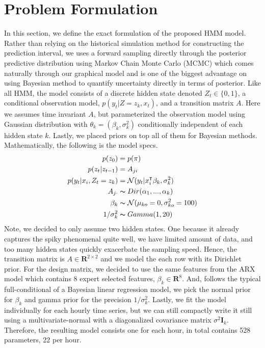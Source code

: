 \documentclass[11pt, letterpaper, journal]{IEEEtran}
\begin{document}
\section{Problem Formulation}
In this section, we define the exact formulation of the proposed HMM model. Rather than relying on the historical simulation method for constructing the prediction interval, we uses a forward sampling directly through the posterior predictive distribution using Markov Chain Monte Carlo (MCMC) which comes naturally through our graphical model and is one of the biggest advantage on using Bayesian method to quantify uncertainty directly in terms of posterior. Like all HMM, the model consists of a discrete hidden state denoted $Z_t \in \{0, 1\}$, a conditional observation model, $p(y_t|Z=z_k, x_t)$, and a transition matrix $A$. Here we assumes time invariant $A$, but parameterized the observation model using Gaussian distribution with $\theta_k=(\beta_k, \sigma_k^2)$ conditionally independent of each hidden state $k$. Lastly, we placed priors on top all of them for Bayesian methods. Mathematically, the following is the model specs.
\begin{align*}
    p(z_0) &= p(\pi) \\
    p(z_t|z_{t-1}) &= A_{ji} \\
    p(y_t|x_i, Z_t=z_k) &= \mathcal{N}(y_t|x_i^{\intercal}\beta_k, \sigma^2_k) \\
    A_{j\cdot} &\thicksim Dir({\alpha_1, ..., \alpha_k}) \\
    \beta_k &\thicksim \mathcal{N}(\mu_{ko}=0, \sigma^2_{ko}=100) \\
    1/\sigma^2_{k} &\thicksim Gamma(1, 20)
\end{align*}
Note, we decided to only assume two hidden states. One because it already captures the spiky phenomenal quite well, we have limited amount of data, and too many hidden states quickly exacerbate the sampling speed. Hence, the transition matrix is $A \in \mathbf{R}^{2\times 2}$ and we model the each row with its Dirichlet prior. For the design matrix, we decided to use the same features from the ARX model which contains 8 expert selected features, $\beta_k \in \mathbf{R}^8$. And, follows the typical full-conditional of a Bayesian linear regression model, we pick the normal prior for $\beta_k$ and gamma prior for the precision $1/\sigma^2_k$. Lastly, we fit the model individually for each hourly time series, but we can still compactly write it still using a multivariate-normal with a diagonalized covariance matrix $\sigma^2\mathbf{I}_k$. Therefore, the resulting model consists one for each hour, in total contains 528 parameters, 22 per hour.
\end{document}

